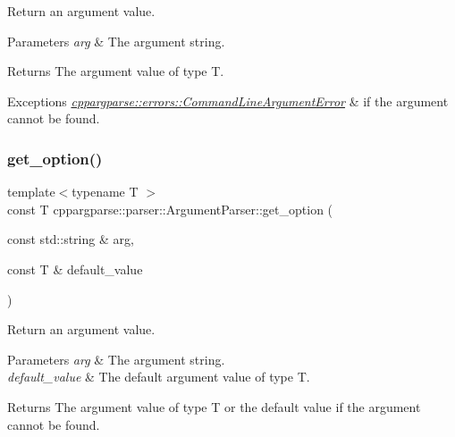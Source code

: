 Return an argument value. 


\begin{DoxyParams}{Parameters}
{\em arg} & The argument string.\\
\hline
\end{DoxyParams}
\begin{DoxyReturn}{Returns}
The argument value of type T. 
\end{DoxyReturn}

\begin{DoxyExceptions}{Exceptions}
{\em \hyperlink{classcppargparse_1_1errors_1_1CommandLineArgumentError}{cppargparse\+::errors\+::\+Command\+Line\+Argument\+Error}} & if the argument cannot be found. \\
\hline
\end{DoxyExceptions}
\mbox{\label{classcppargparse_1_1parser_1_1ArgumentParser_ace8f1ee0e952ee4aba9b668cfbe48c29}} 
\subsubsection{\texorpdfstring{get\+\_\+option()}{get\_option()}\hspace{0.1cm}{\footnotesize\ttfamily [2/2]}}
{\footnotesize\ttfamily template$<$typename T $>$ \\
const T cppargparse\+::parser\+::\+Argument\+Parser\+::get\+\_\+option (\begin{DoxyParamCaption}\item[{const std\+::string \&}]{arg,  }\item[{const T \&}]{default\+\_\+value }\end{DoxyParamCaption})\hspace{0.3cm}{\ttfamily [inline]}}



Return an argument value. 


\begin{DoxyParams}{Parameters}
{\em arg} & The argument string. \\
\hline
{\em default\+\_\+value} & The default argument value of type T.\\
\hline
\end{DoxyParams}
\begin{DoxyReturn}{Returns}
The argument value of type T or the default value if the argument cannot be found. 
\end{DoxyReturn}

